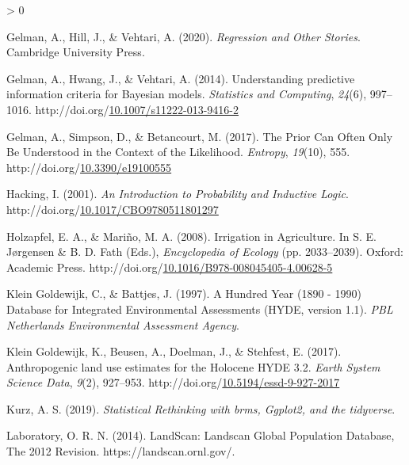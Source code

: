 \documentclass[12pt,twoside]{reedthesis}
\newlength{\cslhangindent}
\newenvironment{CSLReferences}[2] %
 {%
  \setlength{\parindent}{0pt}
  \ifodd #1 \everypar{\setlength{\hangindent}{\cslhangindent}}\ignorespaces\fi
  \ifnum #2 > 0
  \setlength{\parskip}{#2\baselineskip}
  \fi
 }%
 {}
\begin{document}
\begin{CSLReferences}{1}{0}
\leavevmode\hypertarget{ref-gelmanRegressionOtherStories2020}{}%
Gelman, A., Hill, J., \& Vehtari, A. (2020). \emph{Regression and {Other Stories}}. {Cambridge University Press}.

\leavevmode\hypertarget{ref-gelmanUnderstandingPredictiveInformation2014}{}%
Gelman, A., Hwang, J., \& Vehtari, A. (2014). Understanding predictive information criteria for {Bayesian} models. \emph{Statistics and Computing}, \emph{24}(6), 997--1016. http://doi.org/\href{https://doi.org/10.1007/s11222-013-9416-2}{10.1007/s11222-013-9416-2}

\leavevmode\hypertarget{ref-gelmanPriorCanOften2017}{}%
Gelman, A., Simpson, D., \& Betancourt, M. (2017). The {Prior Can Often Only Be Understood} in the {Context} of the {Likelihood}. \emph{Entropy}, \emph{19}(10), 555. http://doi.org/\href{https://doi.org/10.3390/e19100555}{10.3390/e19100555}

\leavevmode\hypertarget{ref-hackingIntroductionProbabilityInductive2001}{}%
Hacking, I. (2001). \emph{An {Introduction} to {Probability} and {Inductive Logic}}. http://doi.org/\href{https://doi.org/10.1017/CBO9780511801297}{10.1017/CBO9780511801297}

\leavevmode\hypertarget{ref-holzapfelIrrigationAgriculture2008}{}%
Holzapfel, E. A., \& Mariño, M. A. (2008). Irrigation in {Agriculture}. In S. E. Jørgensen \& B. D. Fath (Eds.), \emph{Encyclopedia of {Ecology}} (pp. 2033--2039). {Oxford}: {Academic Press}. http://doi.org/\href{https://doi.org/10.1016/B978-008045405-4.00628-5}{10.1016/B978-008045405-4.00628-5}

\leavevmode\hypertarget{ref-kleingoldewijkHundredYear18901997}{}%
Klein Goldewijk, C., \& Battjes, J. (1997). A {Hundred Year} (1890 - 1990) {Database} for {Integrated Environmental Assessments} ({HYDE}, version 1.1). \emph{PBL Netherlands Environmental Assessment Agency}.

\leavevmode\hypertarget{ref-kleingoldewijkAnthropogenicLandUse2017}{}%
Klein Goldewijk, K., Beusen, A., Doelman, J., \& Stehfest, E. (2017). Anthropogenic land use estimates for the {Holocene} {} {HYDE} 3.2. \emph{Earth System Science Data}, \emph{9}(2), 927--953. http://doi.org/\href{https://doi.org/10.5194/essd-9-927-2017}{10.5194/essd-9-927-2017}

\leavevmode\hypertarget{ref-kurzStatisticalRethinkingBrms2019}{}%
Kurz, A. S. (2019). \emph{Statistical {Rethinking} with brms, Ggplot2, and the tidyverse}.

\leavevmode\hypertarget{ref-oakridgenationallaboratoryLandScanLandscanGlobal2014}{}%
Laboratory, O. R. N. (2014). {LandScan}: Landscan {Global Population Database}, {The} 2012 {Revision}. https://landscan.ornl.gov/.


\end{CSLReferences}
\end{document}
